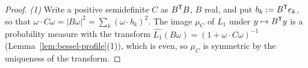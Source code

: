 \begin{proof}
\leanok
{}
\emph{(1)} Write a positive semidefinite $C$ as $B^{\mathsf{T}}B$, $B$ real, and put
$b_k := B^{\mathsf{T}}e_k$, so that $\omega\cdot C\omega = |B\omega|^2 = \sum_k(\omega\cdot b_k)^2$. The
image $\mu_C$ of $L_1$ under $y \mapsto B^{\mathsf{T}}y$ is a probability measure with the transform
$\widehat{L_1}(B\omega) = (1 + \omega\cdot C\omega)^{-1}$ (Lemma~\ref{lem:bessel-profile}(1)), which
is even, so $\mu_C$ is symmetric by the uniqueness of the transform.


\end{proof}
